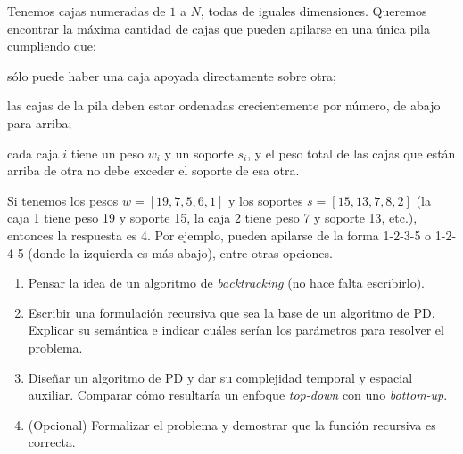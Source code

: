 

\item Tenemos cajas numeradas de $1$ a $N$, todas de iguales dimensiones. Queremos encontrar la máxima cantidad de cajas que pueden apilarse en una única pila cumpliendo que:
\item sólo puede haber una caja apoyada directamente sobre otra;
\item las cajas de la pila deben estar ordenadas crecientemente por número, de abajo para arriba;
\item cada caja $i$ tiene un peso $w_i$ y un soporte $s_i$, y el peso total de las cajas que están arriba de otra no debe exceder el soporte de esa otra.
\par{Si tenemos los pesos $w = [19, 7, 5, 6, 1]$ y los soportes $s = [15, 13, 7, 8, 2]$ (la caja 1 tiene peso 19 y soporte 15, la caja 2 tiene peso 7 y soporte 13, etc.), entonces la respuesta es 4. Por ejemplo, pueden apilarse de la forma 1-2-3-5 o 1-2-4-5 (donde la izquierda es más abajo), entre otras opciones.}

\begin{enumerate}[label=$\alph*)$,ref=$\alph*)$]
\item Pensar la idea de un algoritmo de \textit{backtracking} (no hace falta escribirlo).
\item Escribir una formulación recursiva que sea la base de un algoritmo de PD. Explicar su semántica e indicar cuáles serían los parámetros para resolver el problema.
\item Diseñar un algoritmo de PD y dar su complejidad temporal y espacial auxiliar. Comparar cómo resultaría un enfoque \textit{top-down} con uno \textit{bottom-up}.
\item (Opcional) Formalizar el problema y demostrar que la función recursiva es correcta.
\end{enumerate}

